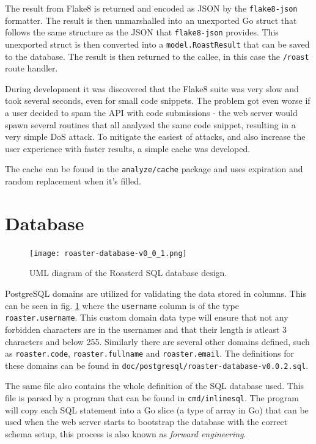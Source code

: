 \documentclass[12pt,a4paper]{report}
\begin{document}
The result from Flake8 is returned and encoded as JSON by the \texttt{flake8-json}\cite{flake8-json} formatter. The result is then unmarshalled into an unexported Go struct that follows the same structure as the JSON that \texttt{flake8-json} provides. This unexported struct is then converted into a \texttt{model.RoastResult} that can be saved to the database. The result is then returned to the callee, in this case the \texttt{/roast} route handler.

During development it was discovered that the Flake8 suite was very slow and took several seconds, even for small code snippets. The problem got even worse if a user decided to spam the API with code submissions - the web server would spawn several routines that all analyzed the same code snippet, resulting in a very simple DoS attack. To mitigate the easiest of attacks, and also increase the user experience with faster results, a simple cache was developed.

The cache can be found in the \texttt{analyze/cache}\cite{roasterd-cache} package and uses expiration and random replacement when it's filled.

\section{Database}
\begin{figure}[H]
  \centering
  \texttt{[image: roaster-database-v0\_0\_1.png]}
  \caption{UML diagram of the Roasterd SQL database design.}
  \label{fig:roasterd-database}
\end{figure}
PostgreSQL domains are utilized for validating the data stored in columns. This can be seen in fig. \ref{fig:roasterd-database} where the \texttt{username} column is of the type \texttt{roaster.username}. This custom domain data type will ensure that not any forbidden characters are in the usernames and that their length is atleast 3 characters and below 255. Similarly there are several other domains defined, such as \texttt{roaster.code}, \texttt{roaster.fullname} and \texttt{roaster.email}. The definitions for these domains can be found in \texttt{doc/postgresql/roaster-database-v0.0.2.sql}\cite{sql-def-line6}.

The same file also contains the whole definition of the SQL database used. This file is parsed by a program that can be found in \texttt{cmd/inlinesql}\cite{roasterd-cmd-inlinesql}. The program will copy each SQL statement into a Go slice (a type of array in Go) that can be used when the web server starts to bootstrap the database with the correct schema setup, this process is also known as \textit{forward engineering}.
\end{document}
